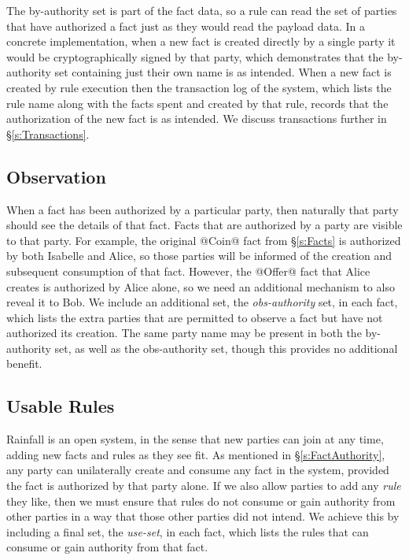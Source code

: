 The by-authority set is part of the fact data, so a rule can read the set of parties that have authorized a fact just as they would read the payload data.
In a concrete implementation, when a new fact is created directly by a single party it would be cryptographically signed by that party, which demonstrates that the by-authority set containing just their own name is as intended.
When a new fact is created by rule execution then the transaction log of the system, which lists the rule name along with the facts spent and created by that rule, records that the authorization of the new fact is as intended. We discuss transactions further in \S\ref{s:Transactions}.


\subsection{Observation}
\label{s:Observation}
When a fact has been authorized by a particular party, then naturally that party should see the details of that fact. Facts that are authorized by a party are visible to that party. For example, the original @Coin@ fact from \S\ref{s:Facts} is authorized by both Isabelle and Alice, so those parties will be informed of the creation and subsequent consumption of that fact. However, the @Offer@ fact that Alice creates is authorized by Alice alone, so we need an additional mechanism to also reveal it to Bob. We include an additional set, the \emph{obs-authority} set, in each fact, which lists the extra parties that are permitted to observe a fact but have not authorized its creation. The same party name may be present in both the by-authority set, as well as the obs-authority set, though this provides no additional benefit.


\subsection{Usable Rules}
Rainfall is an open system, in the sense that new parties can join at any time, adding new facts and rules as they see fit. As mentioned in \S\ref{s:FactAuthority}, any party can unilaterally create and consume any fact in the system, provided the fact is authorized by that party alone. If we also allow parties to add any \emph{rule} they like, then we must ensure that rules do not consume or gain authority from other parties in a way that those other parties did not intend. We achieve this by including a final set, the \emph{use-set}, in each fact, which lists the rules that can consume or gain authority from that fact.

